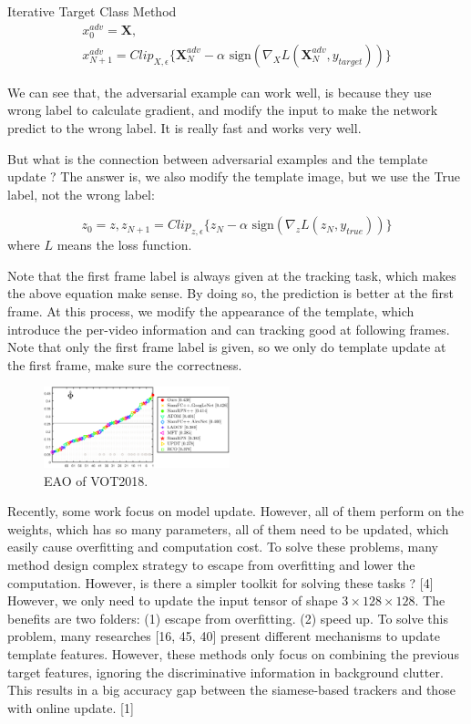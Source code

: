 \documentclass[journal]{IEEEtran}
\begin{document}
Iterative Target Class Method
\begin{equation}
\begin{gathered}
x_0^{adv} = \pmb X,\\
x_{N+1}^{adv} = Clip_{X,\epsilon}\{\pmb X_N^{adv}-\alpha \text{ sign}(\nabla_X L(\pmb X_N^{adv},y_{target}))\}
\end{gathered}
\end{equation}

We can see that, the adversarial example can work well, is because they use wrong label to calculate gradient, and modify the input to make the network predict to the wrong label. It is really fast and works very well.

But what is the connection between adversarial examples and the template update ? The answer is, we also modify the template image, but we use the True label, not the wrong label:

\begin{equation}
z_0 = z, z_{N+1} = Clip_{z,\epsilon}\{z_N -\alpha \text{ sign}(\nabla_z L(z_N,y_{true}))\}
\end{equation}
where $L$ means the loss function.

Note that the first frame label is always given at the tracking task, which makes the above equation make sense. By doing so, the prediction is better at the first frame. At this process, we modify the appearance of the template, which introduce the per-video information and can tracking good at following frames. Note that only the first frame label is given, so we only do template update at the first frame, make sure the correctness.

\begin{figure}[t]
    \centering
    \includegraphics[width=0.48\textwidth]{images/vot18/vot18_eao.pdf}
    \caption{EAO of VOT2018.}
\end{figure}

Recently, some work focus on model update.
However, all of them perform on the weights, which has so many parameters, all of them need to be updated, which easily cause overfitting and computation cost. To solve these problems, many method design complex strategy to escape from overfitting and lower the computation.
However, is there a simpler toolkit for solving these tasks ? [4]
However, we only need to update the input tensor of shape $3\times 128\times128$. The benefits are two folders:
(1) escape from overfitting.
(2) speed up.
To solve this problem, many researches [16, 45, 40] present different mechanisms to update template features. However, these methods only focus on combining the previous target features, ignoring the discriminative information in background clutter. This results in a big accuracy gap between the siamese-based trackers and those with online update. [1]
\end{document}
